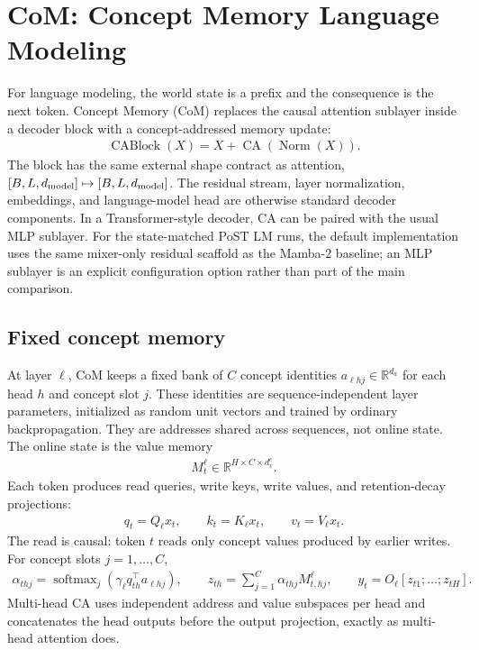 \section{CoM: Concept Memory Language Modeling}
\label{sec:large-model-training}

For language modeling, the world state is a prefix and the consequence is the next token. Concept Memory (CoM) replaces the causal attention sublayer inside a decoder block with a concept-addressed memory update:
\begin{align*}
\operatorname{CABlock}(X)
=
X+\operatorname{CA}(\operatorname{Norm}(X)).
\end{align*}
The block has the same external shape contract as attention, $[B,L,d_{\rm model}]\mapsto[B,L,d_{\rm model}]$. The residual stream, layer normalization, embeddings, and language-model head are otherwise standard decoder components. In a Transformer-style decoder, CA can be paired with the usual MLP sublayer. For the state-matched PoST LM runs, the default implementation uses the same mixer-only residual scaffold as the Mamba-2 baseline; an MLP sublayer is an explicit configuration option rather than part of the main comparison.

\subsection{Fixed concept memory}

At layer $\ell$, CoM keeps a fixed bank of $C$ concept identities $a_{\ell hj}\in\mathbb{R}^{d_a}$ for each head $h$ and concept slot $j$. These identities are sequence-independent layer parameters, initialized as random unit vectors and trained by ordinary backpropagation. They are addresses shared across sequences, not online state. The online state is the value memory
\begin{align*}
M_t^\ell\in\mathbb{R}^{H\times C\times d_v^c}.
\end{align*}
Each token produces read queries, write keys, write values, and retention-decay projections:
\begin{align*}
q_t=Q_\ell x_t,\qquad k_t=K_\ell x_t,\qquad v_t=V_\ell x_t.
\end{align*}
The read is causal: token $t$ reads only concept values produced by earlier writes. For concept slots $j=1,\ldots,C$,
\begin{align*}
\alpha_{thj}
=
\operatorname{softmax}_{j}
\left(\gamma_\ell q_{th}^\top a_{\ell hj}\right),
\qquad
z_{th}=\sum_{j=1}^{C}\alpha_{thj}M_{t,hj}^\ell,
\qquad
y_t=O_\ell[z_{t1};\ldots;z_{tH}].
\end{align*}
Multi-head CA uses independent address and value subspaces per head and concatenates the head outputs before the output projection, exactly as multi-head attention does.

